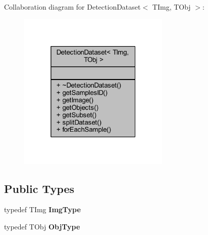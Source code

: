 Collaboration diagram for Detection\+Dataset$<$ T\+Img, T\+Obj $>$\+:
\nopagebreak
\begin{figure}[H]
\begin{center}
\leavevmode
\includegraphics[width=205pt]{class_vision_core_1_1_evaluation_1_1_detection_dataset__coll__graph}
\end{center}
\end{figure}
\subsection*{Public Types}
\begin{DoxyCompactItemize}
\item 
\hypertarget{class_vision_core_1_1_evaluation_1_1_detection_dataset_aaafe8051ac78bd4d8ed3027acd24a1c0}{}typedef T\+Img {\bfseries Img\+Type}\label{class_vision_core_1_1_evaluation_1_1_detection_dataset_aaafe8051ac78bd4d8ed3027acd24a1c0}

\item 
\hypertarget{class_vision_core_1_1_evaluation_1_1_detection_dataset_a34f8ad85716743523e520af46032716e}{}typedef T\+Obj {\bfseries Obj\+Type}\label{class_vision_core_1_1_evaluation_1_1_detection_dataset_a34f8ad85716743523e520af46032716e}

\end{DoxyCompactItemize}
